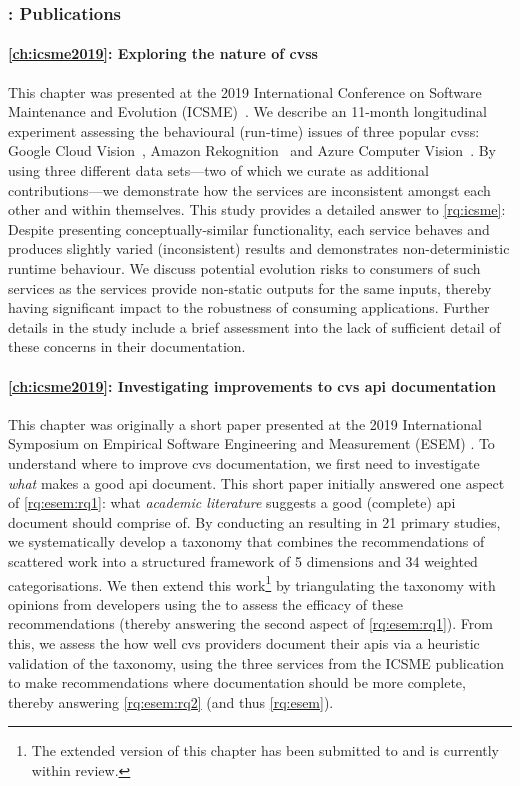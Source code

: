 \subsubsection{: Publications}

\paragraph{\cref{ch:icsme2019}: Exploring the nature of \glspl{cvs}} This chapter was presented at the 2019 International Conference on Software Maintenance and Evolution (ICSME)~\citep{Cummaudo:2019va}. We describe an 11-month longitudinal experiment assessing the behavioural (run-time) issues of three popular \glspl{cvs}: Google Cloud Vision~, Amazon Rekognition~ and Azure Computer Vision~. By using three different data sets---two of which we curate as additional contributions---we demonstrate how the services are inconsistent amongst each other and within themselves. This study provides a detailed answer to \ref{rq:icsme}: Despite presenting conceptually-similar functionality, each service behaves and produces slightly varied (inconsistent) results and demonstrates non-deterministic runtime behaviour. We discuss potential evolution risks to consumers of such services as the services provide non-static outputs for the same inputs, thereby having significant impact to the robustness of consuming applications. Further details in the study include a brief assessment into the lack of sufficient detail of these concerns in their documentation.

\paragraph{\cref{ch:icsme2019}: Investigating improvements to \gls{cvs} \gls{api} documentation} This chapter was originally a short paper presented at the 2019 International Symposium on Empirical Software Engineering and Measurement (ESEM) \citep{Cummaudo:2019th}. To understand where to improve \gls{cvs} documentation, we first need to investigate \textit{what} makes a good \gls{api} document. This short paper initially answered one aspect of \ref{rq:esem:rq1}: what \textit{academic literature} suggests a good (complete) \gls{api} document should comprise of. By conducting an  resulting in 21 primary studies, we systematically develop a taxonomy that combines the recommendations of scattered work into a structured framework of 5 dimensions and 34 weighted categorisations. We then extend this work\footnote{The extended version of this chapter has been submitted to  and is currently within review.} by triangulating the taxonomy with opinions from developers using the  to assess the efficacy of these recommendations (thereby answering the second aspect of \ref{rq:esem:rq1}). From this, we assess the how well \gls{cvs} providers document their \glspl{api} via a heuristic validation of the taxonomy, using the three services from the ICSME publication to make recommendations where documentation should be more complete, thereby answering \ref{rq:esem:rq2} (and thus \ref{rq:esem}).


